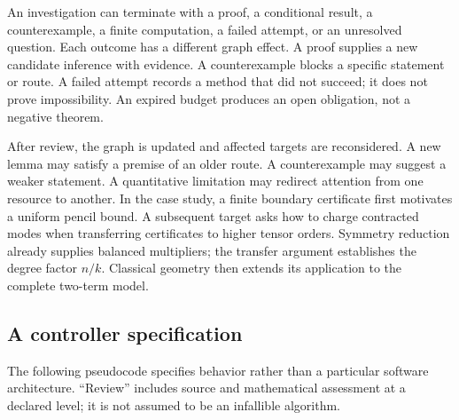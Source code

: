 An investigation can terminate with a proof, a conditional result, a counterexample, a finite computation, a failed attempt, or an unresolved question. Each outcome has a different graph effect. A proof supplies a new candidate inference with evidence. A counterexample blocks a specific statement or route. A failed attempt records a method that did not succeed; it does not prove impossibility. An expired budget produces an open obligation, not a negative theorem.

After review, the graph is updated and affected targets are reconsidered. A new lemma may satisfy a premise of an older route. A counterexample may suggest a weaker statement. A quantitative limitation may redirect attention from one resource to another. In the case study, a finite boundary certificate first motivates a uniform pencil bound. A subsequent target asks how to charge contracted modes when transferring certificates to higher tensor orders. Symmetry reduction already supplies balanced multipliers; the transfer argument establishes the degree factor $n/k$. Classical geometry then extends its application to the complete two-term model.



\subsection{A controller specification}

The following pseudocode specifies behavior rather than a particular software architecture. ``Review'' includes source and mathematical assessment at a declared level; it is not assumed to be an infallible algorithm.

